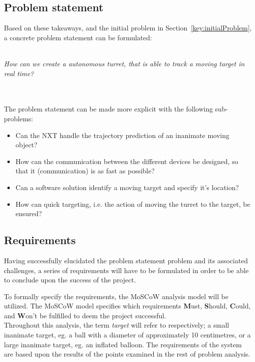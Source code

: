 \subsection{Problem statement}
Based on these takeaways, and the initial problem in Section~\ref{key:initialProblem}, a concrete problem statement can be formulated:\\~\\
\begin{center}
	
	\textit{\large{How can we create a autonomous turret, that is able to track a moving target in real time?}}
\end{center}~\\~\\

The problem statement can be made more explicit with the following sub-problems:
\begin{center}
	\begin{itemize}
		\item Can the NXT handle the trajectory prediction of an inanimate moving object?
		\item How can the communication between the different devices be designed, so that it (communication) is as fast as possible? 
		\item Can a software solution identify a moving target and specify it's location?
		\item How can quick targeting, i.e. the action of moving the turret to the target, be ensured?
	\end{itemize}
\end{center}


\subsection{Requirements}
Having successfully elucidated the problem statement problem and its associated challenges, a series  of requirements will have to be formulated in order to be able to conclude upon the success of the project.

To formally specify the requirements, the MoSCoW analysis model will be utilized. 
The MoSCoW model specifies which requirements \textbf{M}ust, \textbf{S}hould, \textbf{C}ould, and \textbf{W}on't be fulfilled to deem the project successful.\\

Throughout this analysis, the term \textit{target} will refer to respectively; a small inanimate target, eg{.} a ball with a diameter of approximately 10 centimetres, or a large inanimate target, eg{.} an inflated balloon.
The requirements of the system are based upon the results of the points examined in the rest of problem analysis.

